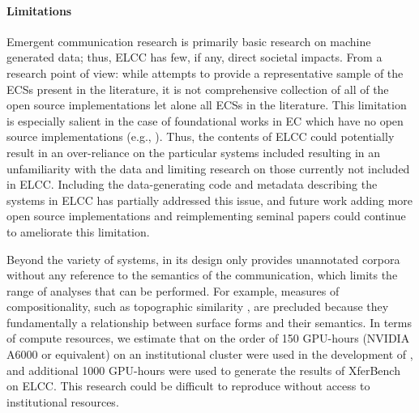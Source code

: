 \paragraph{Limitations}
Emergent communication research is primarily basic research on machine generated data; thus, ELCC has few, if any, direct societal impacts.
From a research point of view:
  while \theLib{} attempts to provide a representative sample of the ECSs present in the literature, it is not comprehensive collection of all of the open source implementations let alone all ECSs in the literature.
This limitation is especially salient in the case of foundational works in EC which have no open source implementations (e.g., \citet{mordatch2018grounded}).
Thus, the contents of ELCC could potentially result in an over-reliance on the particular systems included resulting in an unfamiliarity with the data and limiting research on those currently not included in ELCC\@.
Including the data-generating code and metadata describing the systems in ELCC has partially addressed this issue, and future work adding more open source implementations and reimplementing seminal papers could continue to ameliorate this limitation.

Beyond the variety of systems, in its design \theLib{} only provides unannotated corpora without any reference to the semantics of the communication, which limits the range of analyses that can be performed.
For example, measures of compositionality, such as topographic similarity \citep{brighton2006UnderstandingLE,lazaridou2018emergencelinguisticcommunicationreferential}, are precluded because they fundamentally a relationship between surface forms and their semantics.
In terms of compute resources, we estimate that on the order of 150 GPU-hours (NVIDIA A6000 or equivalent) on an institutional cluster were used in the development of \theLib{}, and additional 1000 GPU-hours were used to generate the results of XferBench on ELCC\@.
This research could be difficult to reproduce without access to institutional resources.


% 




